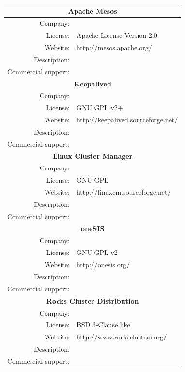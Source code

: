 \documentclass[a4paper, 12pt]{book}
\begin{document}
\FloatBarrier
\begin{table}[H]
  \centering
  \begin{tabular}{ | r m{10cm} | }

    \hline    
    \multicolumn{2}{|c|}{\textbf{Apache Mesos}}\\
    \hline
    Company: &  \\
    License: & Apache License Version 2.0 \\
    Website: & http://mesos.apache.org/ \\
    Description: &  \\
    Commercial support: &  \\
    
    \hline    
    \multicolumn{2}{|c|}{\textbf{Keepalived}}\\
    \hline
    Company: &  \\
    License: & GNU GPL v2+ \\
    Website: & http://keepalived.sourceforge.net/ \\
    Description: &  \\
    Commercial support: &  \\
    
    \hline
    \multicolumn{2}{|c|}{\textbf{Linux Cluster Manager}}\\
    \hline
    Company: &  \\
    License: & GNU GPL \\
    Website: & http://linuxcm.sourceforge.net/ \\
    Description: &  \\
    Commercial support: &  \\
    
    \hline    
    \multicolumn{2}{|c|}{\textbf{oneSIS}}\\
    \hline
    Company: &  \\
    License: & GNU GPL v2 \\
    Website: & http://onesis.org/ \\
    Description: &  \\
    Commercial support: &  \\

    \hline    
    \multicolumn{2}{|c|}{\textbf{Rocks Cluster Distribution}}\\
    \hline
    Company: &  \\
    License: & BSD 3-Clause like \\
    Website: & http://www.rocksclusters.org/ \\
    Description: &  \\
    Commercial support: &  \\
    
    \hline
  \end{tabular}
\label{table:cluster_managers_1}
\end{table}
\end{document}
